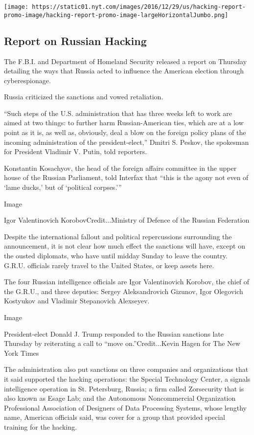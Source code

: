 \texttt{[image: https://static01.nyt.com/images/2016/12/29/us/hacking-report-promo-image/hacking-report-promo-image-largeHorizontalJumbo.png]}

\hypertarget{report-on-russian-hacking}{%
\subsection{Report on Russian Hacking}\label{report-on-russian-hacking}}

The F.B.I. and Department of Homeland Security released a report on
Thursday detailing the ways that Russia acted to influence the American
election through cyberespionage.

Russia criticized the sanctions and vowed retaliation.

``Such steps of the U.S. administration that has three weeks left to
work are aimed at two things: to further harm Russian-American ties,
which are at a low point as it is, as well as, obviously, deal a blow on
the foreign policy plans of the incoming administration of the
president-elect,'' Dmitri S. Peskov, the spokesman for President
Vladimir V. Putin, told reporters.

Konstantin Kosachyov, the head of the foreign affairs committee in the
upper house of the Russian Parliament, told Interfax that ``this is the
agony not even of `lame ducks,' but of `political corpses.'''

Image

Igor Valentinovich KorobovCredit...Ministry of Defence of the Russian
Federation

Despite the international fallout and political repercussions
surrounding the announcement, it is not clear how much effect the
sanctions will have, except on the ousted diplomats, who have until
midday Sunday to leave the country. G.R.U. officials rarely travel to
the United States, or keep assets here.

The four Russian intelligence officials are Igor Valentinovich Korobov,
the chief of the G.R.U., and three deputies: Sergey Aleksandrovich
Gizunov, Igor Olegovich Kostyukov and Vladimir Stepanovich Alexseyev.

Image

President-elect Donald J. Trump responded to the Russian sanctions late
Thursday by reiterating a call to ``move on.''Credit...Kevin Hagen for
The New York Times

The administration also put sanctions on three companies and
organizations that it said supported the hacking operations: the Special
Technology Center, a signals intelligence operation in St. Petersburg,
Russia; a firm called Zorsecurity that is also known as Esage Lab; and
the Autonomous Noncommercial Organization Professional Association of
Designers of Data Processing Systems, whose lengthy name, American
officials said, was cover for a group that provided special training for
the hacking.


